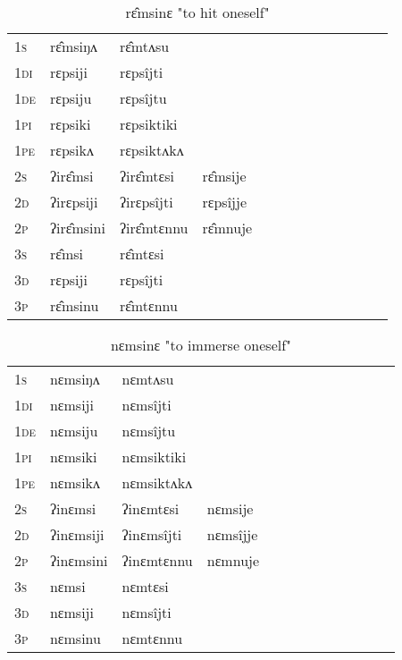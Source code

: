 \documentclass[oldfontcommands,oneside,a4paper,11pt]{article}
\begin{document}
\begin{table}[H]
\label{ɛp.vr} \centering 
\caption{rɛ̂msinɛ  "to hit oneself"  }
\begin{tabular}{l|l|l|l|l|l|l|l|l|l|l|l|l}  \toprule
\textsc{1s} &rɛ̂msiŋʌ &rɛ̂mtʌsu \\ 
\textsc{1di} &rɛpsiji &rɛpsîjti   \\
\textsc{1de} &rɛpsiju &rɛpsîjtu   \\ 
\textsc{1pi} &rɛpsiki &rɛpsiktiki   \\ 
\textsc{1pe} &rɛpsikʌ &rɛpsiktʌkʌ   \\ 
\textsc{2s} & ʔirɛ̂msi & ʔirɛ̂mtɛsi &rɛ̂msije  \\ 
\textsc{2d} & ʔirɛpsiji & ʔirɛpsîjti &rɛpsîjje    \\
\textsc{2p} & ʔirɛ̂msini  & ʔirɛ̂mtɛnnu &rɛ̂mnuje  \\ 
\textsc{3s} & rɛ̂msi & rɛ̂mtɛsi   \\ 
\textsc{3d} & rɛpsiji & rɛpsîjti   \\ 
\textsc{3p} & rɛ̂msinu  & rɛ̂mtɛnnu \\ 
\bottomrule
\end{tabular}
\end{table}


\begin{table}[H]
\label{ɛm.vr} \centering 
\caption{nɛmsinɛ  "to immerse oneself"  }
\begin{tabular}{l|l|l|l|l|l|l|l|l|l|l|l|l}  \toprule
\textsc{1s} &nɛmsiŋʌ &nɛmtʌsu \\ 
\textsc{1di} &nɛmsiji &nɛmsîjti   \\
\textsc{1de} &nɛmsiju &nɛmsîjtu   \\ 
\textsc{1pi} &nɛmsiki &nɛmsiktiki   \\ 
\textsc{1pe} &nɛmsikʌ &nɛmsiktʌkʌ   \\ 
\textsc{2s} & ʔinɛmsi & ʔinɛmtɛsi &nɛmsije  \\ 
\textsc{2d} & ʔinɛmsiji & ʔinɛmsîjti &nɛmsîjje    \\
\textsc{2p} & ʔinɛmsini  & ʔinɛmtɛnnu &nɛmnuje  \\ 
\textsc{3s} & nɛmsi & nɛmtɛsi   \\ 
\textsc{3d} & nɛmsiji & nɛmsîjti   \\ 
\textsc{3p} & nɛmsinu  & nɛmtɛnnu \\ 
\bottomrule
\end{tabular}
\end{table}
\end{document}
